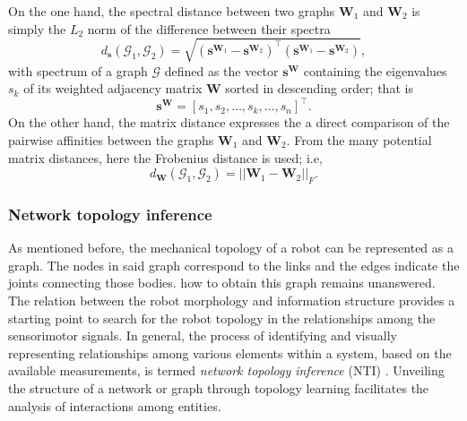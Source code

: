 On the one hand, the spectral distance between two graphs $\bm{W}_1$ and $\bm{W}_2$ is simply the $L_2$ norm of the difference between their spectra
\begin{equation}
	d_{\bm{s}}\left(\mathcal{G}_1,\mathcal{G}_2\right) = \sqrt{\left(\bm{s}^{\bm{W}_1}-\bm{s}^{\bm{W}_2}\right)^\intercal\left(\bm{s}^{\bm{W}_1}-\bm{s}^{\bm{W}_2}\right)},
\end{equation}
with spectrum of a graph $\mathcal{G}$ defined as the vector $ \bm{s}^{\bm{W}}$ containing the eigenvalues $s_k$ of its weighted adjacency matrix $\bm{W}$ sorted in descending order; that is
\begin{equation}
	\bm{s}^{\bm{W}} = [s_1,s_2,\ldots,s_k,\ldots,s_n]^\intercal.
\end{equation}
On the other hand, the matrix distance expresses the a direct comparison of the pairwise affinities between the graphs $\bm{W}_1$ and $\bm{W}_2$. From the many potential matrix distances, here the Frobenius distance is used; i.e,
\begin{equation}
	d_{\bm{W}}\left(\mathcal{G}_1,\mathcal{G}_2\right) =\lvert \lvert \bm{W}_1- \bm{W}_2\rvert \rvert_F.
\end{equation}

\subsubsection{Network topology inference}\label{sec:network_topology_inference}
As mentioned before, the mechanical topology of a robot can be represented as a graph. The nodes in said graph correspond to the links and the edges indicate the joints connecting those bodies. how to obtain this graph remains unanswered. The relation between the robot morphology and information structure provides a starting point to search for the robot topology in the relationships among the sensorimotor signals. In general, the process of identifying and visually representing relationships among various elements within a system, based on the available measurements, is termed \emph{network topology inference} (NTI) \cite{Dong2019Learninggraphsdata}. Unveiling the structure of a network or graph through topology learning facilitates the analysis of interactions among entities. 

